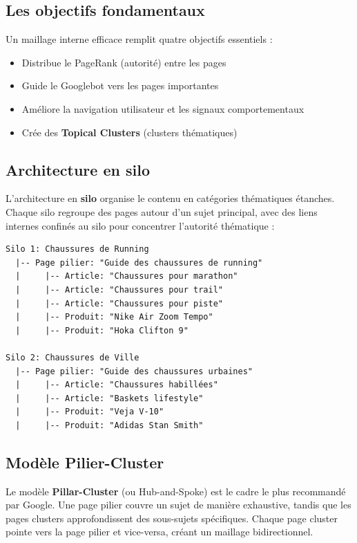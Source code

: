 \documentclass[12pt,a4paper,twoside]{report}
\newcommand{\keyword}[1]{\textbf{\textcolor{googleblue}{#1}}}
\begin{document}
\subsection{Les objectifs fondamentaux}

Un maillage interne efficace remplit quatre objectifs essentiels :
\begin{itemize}
    \item Distribue le PageRank (autorité) entre les pages
    \item Guide le Googlebot vers les pages importantes
    \item Améliore la navigation utilisateur et les signaux comportementaux
    \item Crée des \keyword{Topical Clusters} (clusters thématiques)
\end{itemize}

\subsection{Architecture en silo}

L'architecture en \keyword{silo} organise le contenu en catégories thématiques étanches. Chaque silo regroupe des pages autour d'un sujet principal, avec des liens internes confinés au silo pour concentrer l'autorité thématique :

\begin{lstlisting}[style=htmlcode,caption={Architecture en silo pour un site e-commerce}]
Silo 1: Chaussures de Running
  |-- Page pilier: "Guide des chaussures de running"
  |     |-- Article: "Chaussures pour marathon"
  |     |-- Article: "Chaussures pour trail"
  |     |-- Article: "Chaussures pour piste"
  |     |-- Produit: "Nike Air Zoom Tempo"
  |     |-- Produit: "Hoka Clifton 9"

Silo 2: Chaussures de Ville
  |-- Page pilier: "Guide des chaussures urbaines"
  |     |-- Article: "Chaussures habillées"
  |     |-- Article: "Baskets lifestyle"
  |     |-- Produit: "Veja V-10"
  |     |-- Produit: "Adidas Stan Smith"
\end{lstlisting}

\subsection{Modèle Pilier-Cluster}

Le modèle \keyword{Pillar-Cluster} (ou Hub-and-Spoke) est le cadre le plus recommandé par Google. Une page pilier couvre un sujet de manière exhaustive, tandis que les pages clusters approfondissent des sous-sujets spécifiques. Chaque page cluster pointe vers la page pilier et vice-versa, créant un maillage bidirectionnel.
\end{document}
